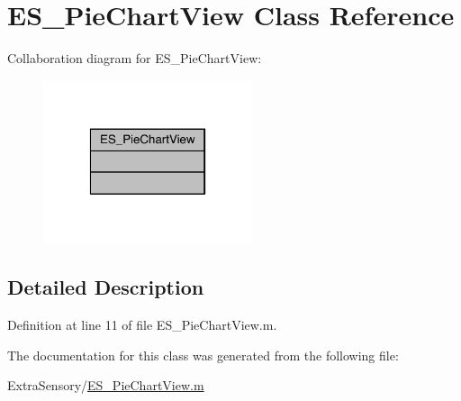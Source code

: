 \hypertarget{class_e_s___pie_chart_view}{\section{E\+S\+\_\+\+Pie\+Chart\+View Class Reference}
\label{class_e_s___pie_chart_view}
}


Collaboration diagram for E\+S\+\_\+\+Pie\+Chart\+View\+:\nopagebreak
\begin{figure}[H]
\begin{center}
\leavevmode
\includegraphics[width=174pt]{d4/d4e/class_e_s___pie_chart_view__coll__graph}
\end{center}
\end{figure}


\subsection{Detailed Description}


Definition at line 11 of file E\+S\+\_\+\+Pie\+Chart\+View.\+m.



The documentation for this class was generated from the following file\+:\begin{DoxyCompactItemize}
\item 
Extra\+Sensory/\hyperlink{_e_s___pie_chart_view_8m}{E\+S\+\_\+\+Pie\+Chart\+View.\+m}\end{DoxyCompactItemize}
